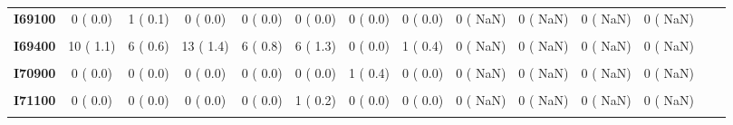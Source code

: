 \documentclass[
]{article}
\begin{document}
\begin{table}[H]
\begin{tabular}[t]{>{\raggedright\arraybackslash}p{5em}ccccccccccccc}
\textbf{I69100} & 0 (  0.0) & 1 (  0.1) & 0 (  0.0) & 0 (  0.0) & 0 (  0.0) & 0 (  0.0) & 0 (  0.0) & 0 (  NaN) & 0 (  NaN) & 0 (  NaN) & 0 (  NaN) &  & \\
\textbf{\cellcolor{gray!10}{I69300}} & \cellcolor{gray!10}{0 (  0.0)} & \cellcolor{gray!10}{0 (  0.0)} & \cellcolor{gray!10}{1 (  0.1)} & \cellcolor{gray!10}{0 (  0.0)} & \cellcolor{gray!10}{1 (  0.2)} & \cellcolor{gray!10}{0 (  0.0)} & \cellcolor{gray!10}{0 (  0.0)} & \cellcolor{gray!10}{0 (  NaN)} & \cellcolor{gray!10}{0 (  NaN)} & \cellcolor{gray!10}{0 (  NaN)} & \cellcolor{gray!10}{0 (  NaN)} & \cellcolor{gray!10}{} & \cellcolor{gray!10}{}\\
\textbf{I69400} & 10 (  1.1) & 6 (  0.6) & 13 (  1.4) & 6 (  0.8) & 6 (  1.3) & 0 (  0.0) & 1 (  0.4) & 0 (  NaN) & 0 (  NaN) & 0 (  NaN) & 0 (  NaN) &  & \\
\textbf{\cellcolor{gray!10}{I70200}} & \cellcolor{gray!10}{0 (  0.0)} & \cellcolor{gray!10}{0 (  0.0)} & \cellcolor{gray!10}{0 (  0.0)} & \cellcolor{gray!10}{0 (  0.0)} & \cellcolor{gray!10}{0 (  0.0)} & \cellcolor{gray!10}{0 (  0.0)} & \cellcolor{gray!10}{1 (  0.4)} & \cellcolor{gray!10}{0 (  NaN)} & \cellcolor{gray!10}{0 (  NaN)} & \cellcolor{gray!10}{0 (  NaN)} & \cellcolor{gray!10}{0 (  NaN)} & \cellcolor{gray!10}{} & \cellcolor{gray!10}{}\\
\textbf{I70900} & 0 (  0.0) & 0 (  0.0) & 0 (  0.0) & 0 (  0.0) & 0 (  0.0) & 1 (  0.4) & 0 (  0.0) & 0 (  NaN) & 0 (  NaN) & 0 (  NaN) & 0 (  NaN) &  & \\
\textbf{\cellcolor{gray!10}{I71000}} & \cellcolor{gray!10}{1 (  0.1)} & \cellcolor{gray!10}{0 (  0.0)} & \cellcolor{gray!10}{1 (  0.1)} & \cellcolor{gray!10}{1 (  0.1)} & \cellcolor{gray!10}{0 (  0.0)} & \cellcolor{gray!10}{0 (  0.0)} & \cellcolor{gray!10}{0 (  0.0)} & \cellcolor{gray!10}{0 (  NaN)} & \cellcolor{gray!10}{0 (  NaN)} & \cellcolor{gray!10}{0 (  NaN)} & \cellcolor{gray!10}{0 (  NaN)} & \cellcolor{gray!10}{} & \cellcolor{gray!10}{}\\
\textbf{I71100} & 0 (  0.0) & 0 (  0.0) & 0 (  0.0) & 0 (  0.0) & 1 (  0.2) & 0 (  0.0) & 0 (  0.0) & 0 (  NaN) & 0 (  NaN) & 0 (  NaN) & 0 (  NaN) &  & \\
\textbf{\cellcolor{gray!10}{I71300}} & \cellcolor{gray!10}{1 (  0.1)} & \cellcolor{gray!10}{1 (  0.1)} & \cellcolor{gray!10}{0 (  0.0)} & \cellcolor{gray!10}{0 (  0.0)} & \cellcolor{gray!10}{0 (  0.0)} & \cellcolor{gray!10}{0 (  0.0)} & \cellcolor{gray!10}{0 (  0.0)} & \cellcolor{gray!10}{0 (  NaN)} & \cellcolor{gray!10}{0 (  NaN)} & \cellcolor{gray!10}{0 (  NaN)} & \cellcolor{gray!10}{0 (  NaN)} & \cellcolor{gray!10}{} & \cellcolor{gray!10}{}\\

\end{tabular}
\end{table}
\end{document}
